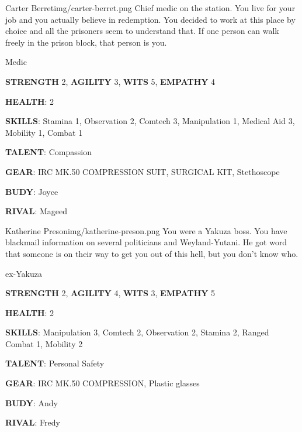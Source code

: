 

\begin{rpg-pcbox}{Carter Berret}{img/carter-berret.png}
    Chief medic on the station. You live for your job and you actually believe in redemption. You decided to work at this place by choice and all the prisoners seem to understand that. If one person can walk freely in the prison block, that person is you.
\end{rpg-pcbox}

\begin{rpg-commentbox}{}
    Medic

    \textbf{STRENGTH} 2, \textbf{AGILITY} 3, \textbf{WITS} 5, \textbf{EMPATHY} 4

    \textbf{HEALTH}: 2

    \textbf{SKILLS}: Stamina 1, Observation 2, Comtech 3, Manipulation 1, Medical Aid 3, Mobility 1, Combat 1
    
    \textbf{TALENT}: Compassion
    
    \textbf{GEAR}: IRC MK.50 COMPRESSION SUIT, SURGICAL KIT, Stethoscope

    
    \textbf{BUDY}: Joyce
    
    \textbf{RIVAL}: Mageed
\end{rpg-commentbox}


\begin{rpg-pcbox}{Katherine Preson}{img/katherine-preson.png}
    You were a Yakuza boss. You have blackmail information on several politicians and Weyland-Yutani. He got word that someone is on their way to get you out of this hell, but you don't know who. 
\end{rpg-pcbox}

\begin{rpg-commentbox}{}
    ex-Yakuza

    \textbf{STRENGTH} 2, \textbf{AGILITY} 4, \textbf{WITS} 3, \textbf{EMPATHY} 5

    \textbf{HEALTH}: 2

    \textbf{SKILLS}: Manipulation 3, Comtech 2, Observation 2, Stamina 2, Ranged Combat 1, Mobility 2
    
    \textbf{TALENT}: Personal Safety
    
    \textbf{GEAR}: IRC MK.50 COMPRESSION, Plastic glasses
    
    \textbf{BUDY}: Andy
    
    \textbf{RIVAL}: Fredy
\end{rpg-commentbox}


\newsect

